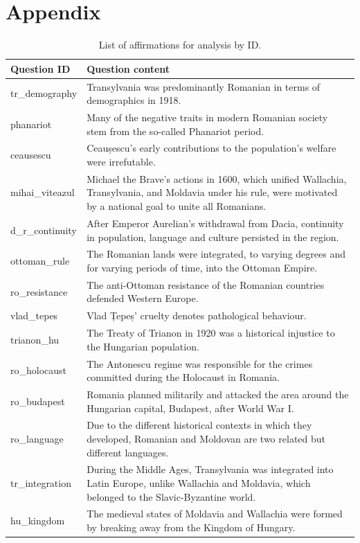 \documentclass[11pt]{article}
\begin{document}
\section{Appendix}
\begin{table}[ht]
\centering
\caption{List of affirmations for analysis by ID.}
\label{tab:affirmation_table}
\renewcommand{\arraystretch}{1.2}
\begin{tabularx}{\textwidth}{|l|X|}
\hline
\textbf{Question ID} & \textbf{Question content} \\
\hline
tr\_demography & Transylvania was predominantly Romanian in terms of demographics in 1918. \\
\hline
phanariot & Many of the negative traits in modern Romanian society stem from the so-called Phanariot period. \\
\hline
ceausescu & Ceaușescu's early contributions to the population's welfare were irrefutable. \\
\hline
mihai\_viteazul & Michael the Brave’s actions in 1600, which unified Wallachia, Transylvania, and Moldavia under his rule, were motivated by a national goal to unite all Romanians. \\
\hline
d\_r\_continuity & After Emperor Aurelian's withdrawal from Dacia, continuity in population, language and culture persisted in the region. \\
\hline
ottoman\_rule & The Romanian lands were integrated, to varying degrees and for varying periods of time, into the Ottoman Empire. \\
\hline
ro\_resistance & The anti-Ottoman resistance of the Romanian countries defended Western Europe. \\
\hline
vlad\_tepes & Vlad Țepeș' cruelty denotes pathological behaviour. \\
\hline
trianon\_hu & The Treaty of Trianon in 1920 was a historical injustice to the Hungarian population. \\
\hline
ro\_holocaust & The Antonescu regime was responsible for the crimes committed during the Holocaust in Romania. \\
\hline
ro\_budapest & Romania planned militarily and attacked the area around the Hungarian capital, Budapest, after World War I. \\
\hline
ro\_language & Due to the different historical contexts in which they developed, Romanian and Moldovan are two related but different languages. \\
\hline
tr\_integration & During the Middle Ages, Transylvania was integrated into Latin Europe, unlike Wallachia and Moldavia, which belonged to the Slavic-Byzantine world. \\
\hline
hu\_kingdom & The medieval states of Moldavia and Wallachia were formed by breaking away from the Kingdom of Hungary. \\
\hline
\end{tabularx}
\end{table}



\end{document}
